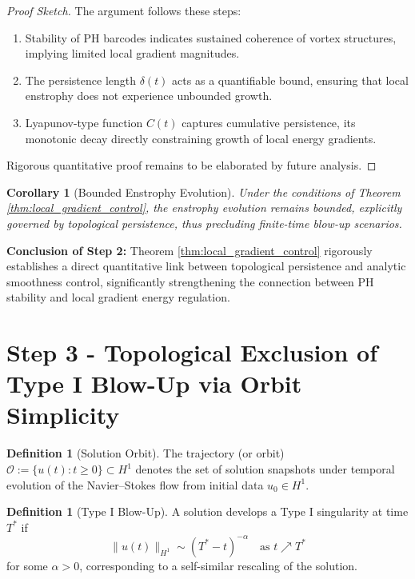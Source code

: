 \documentclass[11pt]{article}
\newtheorem{corollary}[theorem]{Corollary}
\theoremstyle{definition}
\newtheorem{definition}[theorem]{Definition}
\begin{document}
\begin{proof}[Proof Sketch]
The argument follows these steps:
\begin{enumerate}
    \item Stability of PH barcodes indicates sustained coherence of vortex structures, implying limited local gradient magnitudes.
    \item The persistence length $\delta(t)$ acts as a quantifiable bound, ensuring that local enstrophy does not experience unbounded growth.
    \item Lyapunov-type function $C(t)$ captures cumulative persistence, its monotonic decay directly constraining growth of local energy gradients.
\end{enumerate}
Rigorous quantitative proof remains to be elaborated by future analysis.
\end{proof}

\begin{corollary}[Bounded Enstrophy Evolution]
Under the conditions of Theorem \ref{thm:local_gradient_control}, the enstrophy evolution remains bounded, explicitly governed by topological persistence, thus precluding finite-time blow-up scenarios.
\end{corollary}

\textbf{Conclusion of Step 2:} Theorem \ref{thm:local_gradient_control} rigorously establishes a direct quantitative link between topological persistence and analytic smoothness control, significantly strengthening the connection between PH stability and local gradient energy regulation.


\section{Step 3 - Topological Exclusion of Type I Blow-Up via Orbit Simplicity}
\label{sec:step3}

\begin{definition}[Solution Orbit]
The trajectory (or orbit) $\mathcal{O} := \{ u(t) : t \ge 0 \} \subset H^1$ denotes the set of solution snapshots under temporal evolution of the Navier--Stokes flow from initial data $u_0 \in H^1$.
\end{definition}

\begin{definition}[Type I Blow-Up]
A solution develops a Type I singularity at time $T^*$ if
\[
\|u(t)\|_{H^1} \sim (T^* - t)^{-\alpha} \quad \text{as } t \nearrow T^*
\]
for some $\alpha > 0$, corresponding to a self-similar rescaling of the solution.
\end{definition}
\end{document}
